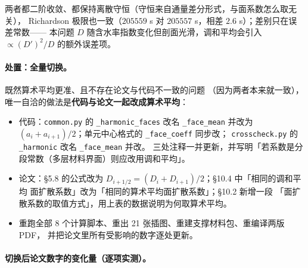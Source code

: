 \documentclass[11pt,a4paper]{ctexart}
\newcommand{\src}[1]{\texttt{#1}}
\begin{document}
\noindent 两者都二阶收敛、都保持离散守恒（守恒来自通量差分形式，与面系数怎么取无关），
Richardson 极限也一致（$205559$ s 对 $205557$ s，相差 $2.6$ s）；差别只在误差常数——
本问题 $D$ 随含水率指数变化但剖面光滑，调和平均会引入 $\propto(D')^2/D$ 的额外误差项。

\paragraph{处置：全量切换。}既然算术平均更准、且不存在论文与代码不一致的问题
（因为两者本来就一致），唯一自洽的做法是\textbf{代码与论文一起改成算术平均}：

\begin{itemize}[leftmargin=1.6em,itemsep=2pt]
  \item 代码：\src{common.py} 的 \src{\_harmonic\_faces} 改名 \src{\_face\_mean} 并改为
  $(a_i+a_{i+1})/2$；单元中心格式的 \src{\_face\_coeff} 同步改；
  \src{crosscheck.py} 的 \src{\_harmonic} 改名 \src{\_face\_mean} 并改。
  三处注释一并更新，并写明「若系数是分段常数（多层材料界面）则应改用调和平均」。
  \item 论文：§5.8 的公式改为 $D_{i+1/2}=(D_i+D_{i+1})/2$；§10.4 中「相同的调和平均
  面扩散系数」改为「相同的算术平均面扩散系数」；§10.2 新增一段
  「面扩散系数的取值方式」，用上表的数据说明为何取算术平均。
  \item 重跑全部 8 个计算脚本、重出 21 张插图、重建支撑材料包、重编译两版 PDF，
  并把论文里所有受影响的数字逐处更新。
\end{itemize}

\paragraph{切换后论文数字的变化量（逐项实测）。}
\end{document}
